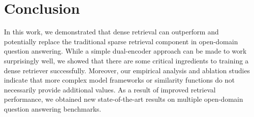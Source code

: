 \section{Conclusion}
\label{sec:conclusion}

In this work, we demonstrated that dense retrieval can outperform and potentially replace the traditional sparse retrieval component in open-domain question answering. While a simple dual-encoder approach can be made to work surprisingly well, we showed that there are some critical ingredients to training a dense retriever successfully. Moreover, our empirical analysis and ablation studies indicate that more complex model frameworks or similarity functions do not necessarily provide additional values. As a result of improved retrieval performance, we obtained new state-of-the-art results on multiple open-domain question answering benchmarks.


